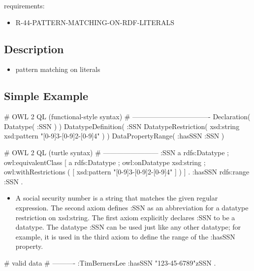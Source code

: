\documentclass{llncs}
\begin{document}
requirements:

\begin{itemize}
  \item R-44-PATTERN-MATCHING-ON-RDF-LITERALS
\end{itemize}

\subsection{Description}

\begin{itemize}
	\item pattern matching on literals
\end{itemize}

\subsection{Simple Example}

\begin{ex}
# OWL 2 QL (functional-style syntax)
# ----------------------------------
Declaration( Datatype( :SSN ) ) 
DatatypeDefinition( 
    :SSN
    DatatypeRestriction( xsd:string xsd:pattern "[0-9]{3}-[0-9]{2}-[0-9]{4}" ) )     
DataPropertyRange( :hasSSN :SSN ) 
\end{ex}

\begin{ex}
# OWL 2 QL (turtle syntax)
# ------------------------
:SSN 
    a rdfs:Datatype ;
    owl:equivalentClass [
        a rdfs:Datatype ;
        owl:onDatatype xsd:string ;
        owl:withRestrictions ( 
            [ xsd:pattern "[0-9]{3}-[0-9]{2}-[0-9]{4}" ] ) ] .
:hasSSN rdfs:range :SSN .
\end{ex}

\begin{itemize}
	\item A social security number is a string that matches the given regular expression. 
The second axiom defines :SSN as an abbreviation for a datatype restriction on xsd:string. 
The first axiom explicitly declares :SSN to be a datatype. 
The datatype :SSN can be used just like any other datatype; 
for example, it is used in the third axiom to define the range of the :hasSSN property. 
\end{itemize}

\begin{ex}
# valid data
# ----------
:TimBernersLee
    :hasSSN "123-45-6789"^^:SSN .
\end{ex}
\end{document}
